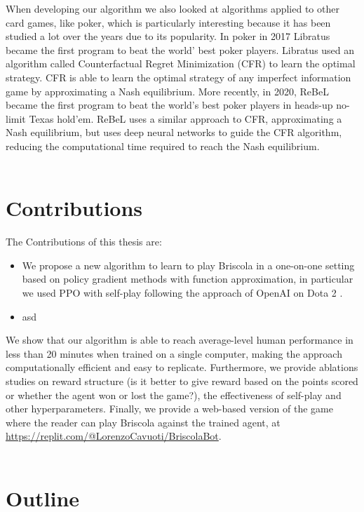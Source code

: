 When developing our algorithm we also looked at algorithms applied to other card games, like poker, which is particularly interesting because it has been studied a lot over the years due to its popularity. In poker in 2017 Libratus \cite{libratus} became the first program to beat the world' best poker players. Libratus used an algorithm called Counterfactual Regret Minimization (CFR) \cite{cfr} to learn the optimal strategy. CFR is able to learn the optimal strategy of any imperfect information game by approximating a Nash equilibrium. More recently, in 2020, ReBeL \cite{rebel} became the first program to beat the world's best poker players in heads-up no-limit Texas hold'em. ReBeL uses a similar approach to CFR, approximating a Nash equilibrium, but uses deep neural networks to guide the CFR algorithm, reducing the computational time required to reach the Nash equilibrium.\\\\

\section{Contributions}
The Contributions of this thesis are:
\begin{itemize}
    \item We propose a new algorithm to learn to play Briscola in a one-on-one setting based on policy gradient methods with function approximation, in particular we used PPO with self-play following the approach of OpenAI on Dota 2 \cite{open-ai-five}.
    \item asd
\end{itemize}


We show that our algorithm is able to reach average-level human performance in less than 20 minutes when trained on a single computer, making the approach computationally efficient and easy to replicate. Furthermore, we provide ablations studies on reward structure (is it better to give reward based on the points scored or whether the agent won or lost the game?), the effectiveness of self-play and other hyperparameters. Finally, we provide a web-based version of the game where the reader can play Briscola against the trained agent, at \href{https://replit.com/@LorenzoCavuoti/BriscolaBot}{https://replit.com/@LorenzoCavuoti/BriscolaBot}.\\\\

\section{Outline}